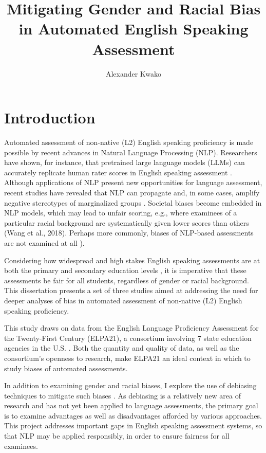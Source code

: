 \documentclass [PhD] {uclathes}
\title          {Mitigating Gender and Racial Bias \\
                in Automated English Speaking Assessment}
\author         {Alexander Kwako}
\begin{document}
\makeintropages

%
%

\chapter{Introduction}

Automated assessment of non-native (L2) English speaking proficiency is made possible by recent advances in Natural Language Processing (NLP). Researchers have shown, for instance, that pretrained large language models (LLMs) can accurately replicate human rater scores in English speaking assessment \citep{wang2021automated}. Although applications of NLP present new opportunities for language assessment, recent studies have revealed that NLP can propagate and, in some cases, amplify negative stereotypes of marginalized groups \citep{blodgett2020}. Societal biases become embedded in NLP models, which may lead to unfair scoring, e.g., where examinees of a particular racial background are systematically given lower scores than others (Wang et al., 2018). Perhaps more commonly, biases of NLP-based assessments are not examined at all \citep[e.g.][]{collier2020test, ormerod2022automated}). 

Considering how widespread and high stakes English speaking assessments are at both the primary and secondary education levels \citep{cimpian2017, ets2005}, it is imperative that these assessments be fair for all students, regardless of gender or racial background. This dissertation presents a set of three studies aimed at addressing the need for deeper analyses of bias in automated assessment of non-native (L2) English speaking proficiency. 

This study draws on data from the English Language Proficiency Assessment for the Twenty-First Century (ELPA21), a consortium involving 7 state education agencies in the U.S. \citep{huang2018english}. Both the quantity and quality of data, as well as the consortium’s openness to research, make ELPA21 an ideal context in which to study biases of automated assessments.

In addition to examining gender and racial biases, I explore the use of debiasing techniques to mitigate such biases \citep{sun2019mitigating}. As debiasing is a relatively new area of research and has not yet been applied to language assessments, the primary goal is to examine advantages as well as disadvantages afforded by various approaches. This project addresses important gaps in English speaking assessment systems, so that NLP may be applied responsibly, in order to ensure fairness for all examinees.
\end{document}
